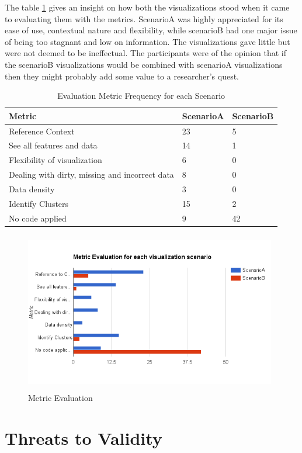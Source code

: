 \documentclass[seploa]{beavtex}
\begin{document}
The table \ref{tab:freq} gives an insight on how both the visualizations stood when it came to evaluating them with the metrics. ScenarioA was highly appreciated for its ease of use, contextual nature and flexibility, while scenarioB had one major issue of being too stagnant and low on information. The visualizations gave little but were not deemed to be ineffectual. The participants were of the opinion that if the scenarioB visualizations would be combined with scenarioA visualizations then they might probably add some value to a researcher's quest.

\begin{table}[H]
\centering
\begin{tabular}{ |p{5cm}|p{3cm}|p{3cm}|  }
 \hline
Metric & ScenarioA & ScenarioB\\
 \hline
 Reference Context & 23 & 5\\ \hline
 See all features and data & 14 & 1\\ \hline
 Flexibility of visualization & 6 & 0\\ \hline
 Dealing with dirty, missing and incorrect data & 8 & 0\\ \hline
 Data density & 3 & 0\\ \hline
 Identify Clusters & 15 & 2\\ \hline
 No code applied & 9 & 42\\ 
 \hline
\end{tabular}
\caption{Evaluation Metric Frequency for each Scenario}
\label{tab:freq}
\end{table}

\begin{figure}[!ht]
\centering
\includegraphics[width=110mm,height=70mm]{metric.png}
\caption{Metric Evaluation}
\end{figure}

\chapter{Threats to Validity}
\end{document}
